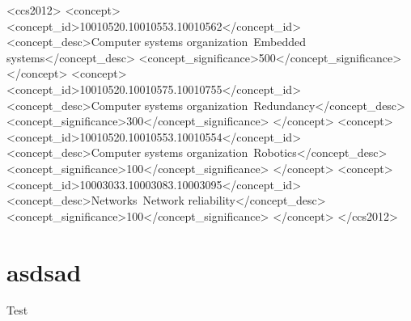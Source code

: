 \documentclass[sigconf]{acmart}
\begin{document}
%
%
\begin{CCSXML}
<ccs2012>
 <concept>
  <concept_id>10010520.10010553.10010562</concept_id>
  <concept_desc>Computer systems organization~Embedded systems</concept_desc>
  <concept_significance>500</concept_significance>
 </concept>
 <concept>
  <concept_id>10010520.10010575.10010755</concept_id>
  <concept_desc>Computer systems organization~Redundancy</concept_desc>
  <concept_significance>300</concept_significance>
 </concept>
 <concept>
  <concept_id>10010520.10010553.10010554</concept_id>
  <concept_desc>Computer systems organization~Robotics</concept_desc>
  <concept_significance>100</concept_significance>
 </concept>
 <concept>
  <concept_id>10003033.10003083.10003095</concept_id>
  <concept_desc>Networks~Network reliability</concept_desc>
  <concept_significance>100</concept_significance>
 </concept>
</ccs2012>
\end{CCSXML}





\maketitle

%
\chapter{asdsad}
Test



\end{document}

